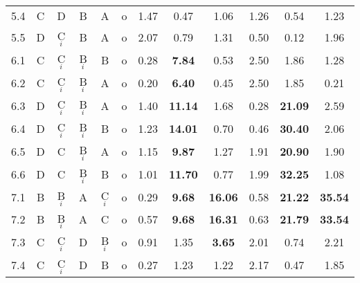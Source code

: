\documentclass[12pt,letterpaper]{article}
\begin{document}
\begin{table}
\begin{center}
\begin{tabular*}{0.80\textwidth}{@{\extracolsep{\fill}}lccccc|ccc|ccc}
5.4          &C         &D        &B             &A      &o    &1.47       &     0.47     &  1.06    & 1.26       &    0.54     &  1.23     \\
5.5          &D         &C$_i$    &B             &A      &o    &2.07        &    0.79     &   1.31   & 0.50       &    0.12     &  1.96     \\
6.1          &C         &C$_i$    &B$_i$         &B      &o     &0.28       &   \bf 7.84   &  0.53   & 2.50       &    1.86     &  1.28     \\
6.2          &C         &C$_i$    &B$_i$         &A      &o     &0.20       &   \bf 6.40   &  0.45   & 2.50       &    1.85     &  0.21     \\
6.3          &D         &C$_i$    &B$_i$         &A      &o     &1.40       &   \bf 11.14  &  1.68   & 0.28       &    \bf21.09 &  2.59     \\
6.4          &D         &C$_i$    &B$_i$         &B      &o     &1.23       &   \bf 14.01  &  0.70   & 0.46       &    \bf30.40 &  2.06     \\
6.5          &D         &C        &B$_i$         &A      &o     &1.15       &   \bf 9.87   &  1.27   & 1.91       &    \bf20.90 &  1.90    \\
6.6          &D         &C        &B$_i$         &B      &o     &1.01       &   \bf 11.70  &  0.77   & 1.99       &    \bf32.25 &  1.08    \\
7.1          &B         &B$_i$    &A             &C$_i$  &o     &0.29       &   \bf 9.68   &\bf16.06  &0.58        &   \bf 21.22 &  \bf35.54 \\ 
7.2          &B         &B$_i$    &A             &C      &o     &0.57     &  \bf 9.68    & \bf16.31  &0.63        &  \bf 21.79  &  \bf33.54 \\ 
7.3          &C         &C$_i$    &D             &B$_i$  &o    &0.91      & 1.35         & \bf3.65   & 2.01       &  0.74       & 2.21      \\
7.4          &C         &C$_i$    &D             &B      &o    &0.27      & 1.23        & 1.22       & 2.17       &  0.47       & 1.85      \\
\hline
\hline
\end{tabular*}
\end{center}
\end{table}
\clearpage
\newpage
\end{document}
